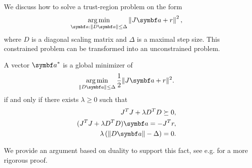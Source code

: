 We discuss how to solve a trust-region problem on the form
\begin{equation}
  \label{eq:lm_minimize_trust}
  \argmin_{\a : \| D \a \| \leq \Delta}\left\|J \a + r \right \|^2,
\end{equation}
where $D$ is a diagonal scaling matrix and $\Delta$ is a maximal step size. This constrained problem can be transformed into an unconstrained problem.
\begin{theorem}
  \label{thm:lm}
  A vector $\a^*$ is a global minimizer of
  \begin{equation}
    \argmin_{\| D \a \| \leq \Delta} \frac{1}{2} \| J \a + r \|^2.
  \end{equation}
  if and only if there exists $\lambda \geq 0$ such that
  \begin{subequations}
    \begin{align}
      J^T J + \lambda D^T D \succeq 0,                              \\
      (J^T J + \lambda D^T D) \a = -J^T r,  \label{eq:lm_normaleqs} \\
      \lambda \left( \left\| D \a \right\| - \Delta \right)=0.
    \end{align}
  \end{subequations}
\end{theorem}
We provide an argument based on duality to support this fact, see e.g. \cite[Theorem 4.1]{nocedal_numerical_2006} for a more rigorous proof.
